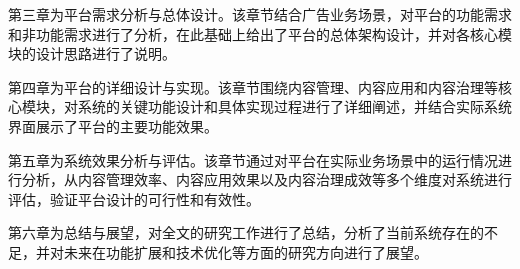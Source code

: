第三章为平台需求分析与总体设计。该章节结合广告业务场景，对平台的功能需求和非功能需求进行了分析，在此基础上给出了平台的总体架构设计，并对各核心模块的设计思路进行了说明。

第四章为平台的详细设计与实现。该章节围绕内容管理、内容应用和内容治理等核心模块，对系统的关键功能设计和具体实现过程进行了详细阐述，并结合实际系统界面展示了平台的主要功能效果。

第五章为系统效果分析与评估。该章节通过对平台在实际业务场景中的运行情况进行分析，从内容管理效率、内容应用效果以及内容治理成效等多个维度对系统进行评估，验证平台设计的可行性和有效性。

第六章为总结与展望，对全文的研究工作进行了总结，分析了当前系统存在的不足，并对未来在功能扩展和技术优化等方面的研究方向进行了展望。
